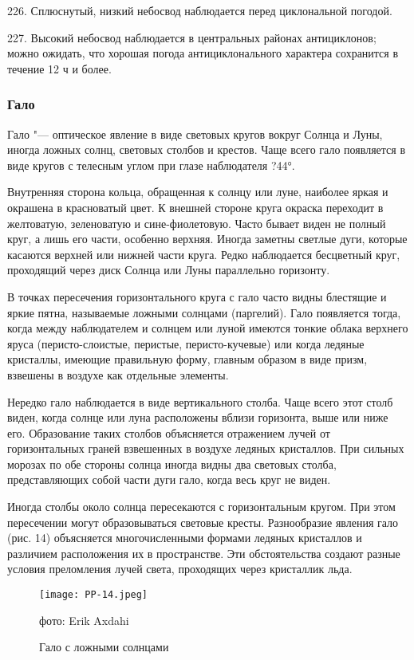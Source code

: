 226. Сплюснутый, низкий небосвод наблюдается перед циклональной погодой.

227. Высокий небосвод наблюдается в центральных районах антициклонов; можно ожидать, что хорошая погода антициклонального характера сохранится в течение 12 ч и более.

\subsubsection{Гало}

Гало "--- оптическое явление в виде световых кругов вокруг Солнца и Луны, иногда ложных солнц, световых столбов и крестов. Чаще всего гало появляется в виде кругов с телесным углом при глазе наблюдателя ?44°.

Внутренняя сторона кольца, обращенная к солнцу или луне, наиболее яркая и окрашена в красноватый цвет. К внешней стороне круга окраска переходит в желтоватую, зеленоватую и сине-фиолетовую. Часто бывает виден не полный круг, а лишь его части, особенно верхняя. Иногда заметны светлые дуги, которые касаются верхней или нижней части круга. Редко наблюдается бесцветный круг, проходящий через диск Солнца или Луны параллельно горизонту.

В точках пересечения горизонтального круга с гало часто видны блестящие и яркие пятна, называемые ложными солнцами (паргелий). Гало появляется тогда, когда между наблюдателем и солнцем или луной имеются тонкие облака верхнего яруса (перисто-слоистые, перистые, перисто-кучевые) или когда ледяные кристаллы, имеющие правильную форму, главным образом в виде призм, взвешены в воздухе как отдельные элементы.

Нередко гало наблюдается в виде вертикального столба. Чаще всего этот столб виден, когда солнце или луна расположены вблизи горизонта, выше или ниже его. Образование таких столбов объясняется отражением лучей от горизонтальных граней взвешенных в воздухе ледяных кристаллов. При сильных морозах по обе стороны солнца иногда видны два световых столба, представляющих собой части дуги гало, когда весь круг не виден.

Иногда столбы около солнца пересекаются с горизонтальным кругом. При этом пересечении могут образовываться световые кресты. Разнообразие явления гало (рис. 14) объясняется многочисленными формами ледяных кристаллов и различием расположения их в пространстве. Эти обстоятельства создают разные условия преломления лучей света, проходящих через кристаллик льда.

\begin{figure}[htb]
  \centering{}
  \texttt{[image: PP-14.jpeg]}
  \caption{Гало с ложными солнцами}
  \label{fig:pp14}
  \small
  \centering{}фото: Erik Axdahi
\end{figure}

